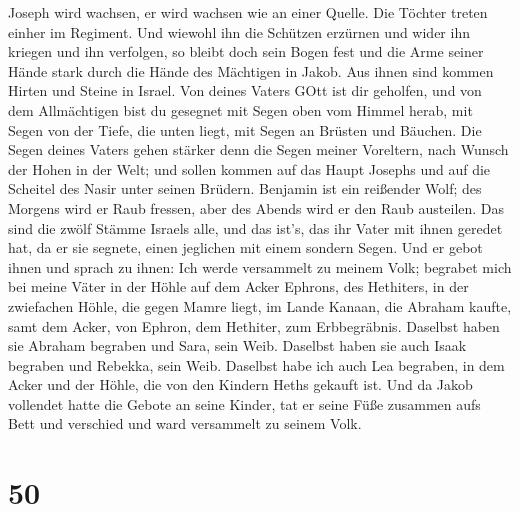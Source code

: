  Joseph wird wachsen, er wird wachsen wie an einer Quelle.
Die Töchter treten einher im Regiment.  Und wiewohl ihn die
Schützen erzürnen und wider ihn kriegen und ihn verfolgen, 
so bleibt doch sein Bogen fest und die Arme seiner Hände stark durch die
Hände des Mächtigen in Jakob. Aus ihnen sind kommen Hirten und Steine in
Israel.  Von deines Vaters GOtt ist dir geholfen, und von
dem Allmächtigen bist du gesegnet mit Segen oben vom Himmel herab, mit
Segen von der Tiefe, die unten liegt, mit Segen an Brüsten und Bäuchen.
 Die Segen deines Vaters gehen stärker denn die Segen
meiner Voreltern, nach Wunsch der Hohen in der Welt; und sollen kommen
auf das Haupt Josephs und auf die Scheitel des Nasir unter seinen
Brüdern.  Benjamin ist ein reißender Wolf; des Morgens wird
er Raub fressen, aber des Abends wird er den Raub austeilen.
 Das sind die zwölf Stämme Israels alle, und das ist's, das
ihr Vater mit ihnen geredet hat, da er sie segnete, einen jeglichen mit
einem sondern Segen.  Und er gebot ihnen und sprach zu
ihnen: Ich werde versammelt zu meinem Volk; begrabet mich bei meine
Väter in der Höhle auf dem Acker Ephrons, des Hethiters, 
in der zwiefachen Höhle, die gegen Mamre liegt, im Lande Kanaan, die
Abraham kaufte, samt dem Acker, von Ephron, dem Hethiter, zum
Erbbegräbnis.  Daselbst haben sie Abraham begraben und
Sara, sein Weib. Daselbst haben sie auch Isaak begraben und Rebekka,
sein Weib. Daselbst habe ich auch Lea begraben,  in dem
Acker und der Höhle, die von den Kindern Heths gekauft ist.
 Und da Jakob vollendet hatte die Gebote an seine Kinder,
tat er seine Füße zusammen aufs Bett und verschied und ward versammelt
zu seinem Volk.

\hypertarget{section-49}{%
\section{50}\label{section-49}}

